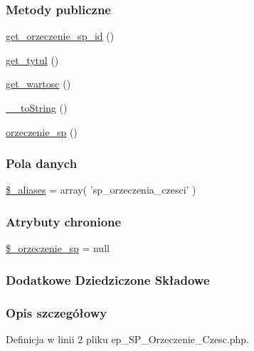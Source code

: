 \subsubsection*{Metody publiczne}
\begin{DoxyCompactItemize}
\item 
\hyperlink{classep___s_p___orzeczenie___czesc_a98a84a7375b3d05cb4516bbb2c7f3e04}{get\-\_\-orzeczenie\-\_\-sp\-\_\-id} ()
\item 
\hyperlink{classep___s_p___orzeczenie___czesc_a7a617fdf7cae1fab50701631abf3ad03}{get\-\_\-tytul} ()
\item 
\hyperlink{classep___s_p___orzeczenie___czesc_a0fe99e5c9ee82a3647c1f719f51ed3c6}{get\-\_\-wartosc} ()
\item 
\hyperlink{classep___s_p___orzeczenie___czesc_a7516ca30af0db3cdbf9a7739b48ce91d}{\-\_\-\-\_\-to\-String} ()
\item 
\hyperlink{classep___s_p___orzeczenie___czesc_a498c7b61096c1bcb941e93a8d1385318}{orzeczenie\-\_\-sp} ()
\end{DoxyCompactItemize}
\subsubsection*{Pola danych}
\begin{DoxyCompactItemize}
\item 
\hyperlink{classep___s_p___orzeczenie___czesc_ab4e31d75f0bc5d512456911e5d01366b}{\$\-\_\-aliases} = array( 'sp\-\_\-orzeczenia\-\_\-czesci' )
\end{DoxyCompactItemize}
\subsubsection*{Atrybuty chronione}
\begin{DoxyCompactItemize}
\item 
\hyperlink{classep___s_p___orzeczenie___czesc_aa2e1ecb50e6fae26a854ac995f7226b8}{\$\-\_\-orzeczenie\-\_\-sp} = null
\end{DoxyCompactItemize}
\subsubsection*{Dodatkowe Dziedziczone Składowe}


\subsubsection{Opis szczegółowy}


Definicja w linii 2 pliku ep\-\_\-\-S\-P\-\_\-\-Orzeczenie\-\_\-\-Czesc.\-php.



